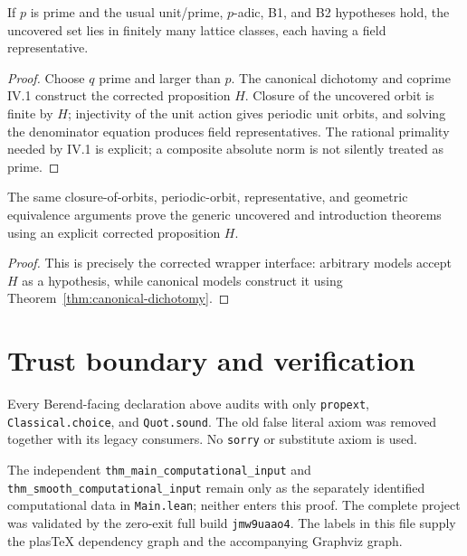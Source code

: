 \begin{theorem}
  \label{thm:canonical-uncovered}
  \leanok
  If \(p\) is prime and the usual unit/prime, \(p\)-adic, B1, and B2 hypotheses hold,
  the uncovered set lies in finitely many lattice classes, each having a field
  representative.
\end{theorem}
\begin{proof}
  Choose \(q\) prime and larger than \(p\). The canonical dichotomy and coprime
  IV.1 construct the corrected proposition \(H\). Closure of the uncovered
  orbit is finite by \(H\); injectivity of the unit action gives periodic
  unit orbits, and solving the denominator equation produces field
  representatives. The rational primality needed by IV.1 is explicit; a
  composite absolute norm is not silently treated as prime.
\end{proof}

\begin{corollary}
  \label{cor:generic-paper}
  \leanok
  The same closure-of-orbits, periodic-orbit, representative, and geometric
  equivalence arguments prove the generic uncovered and introduction theorems
  using an explicit corrected proposition \(H\).
\end{corollary}
\begin{proof}
  This is precisely the corrected wrapper interface: arbitrary models accept
  \(H\) as a hypothesis, while canonical models construct it using
  Theorem~\ref{thm:canonical-dichotomy}.
\end{proof}

\section{Trust boundary and verification}

Every Berend-facing declaration above audits with only \texttt{propext},
\texttt{Classical.choice}, and \texttt{Quot.sound}. The old false literal axiom
was removed together with its legacy consumers. No \texttt{sorry} or substitute
axiom is used.

The independent \texttt{thm\_main\_computational\_input} and
\texttt{thm\_smooth\_computational\_input} remain only as the separately
identified computational data in \texttt{Main.lean}; neither enters this proof.
The complete project was validated by the zero-exit full build
\texttt{jmw9uaao4}. The labels in this file supply the plasTeX dependency graph
and the accompanying Graphviz graph.
